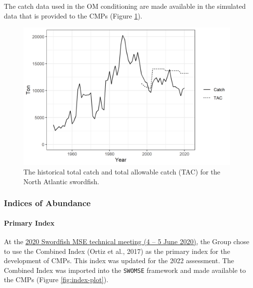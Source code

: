 \documentclass[
]{article}
\begin{document}
The catch data used in the OM conditioning are made available in the simulated data that is provided to the CMPs (Figure \ref{fig:catch-plot}).

\begin{figure}
\includegraphics[width=25in]{../../img/Catch_TAC} \caption{The historical total catch and total allowable catch (TAC) for the North Atlantic swordfish.}\label{fig:catch-plot}
\end{figure}

\hypertarget{indices-of-abundance}{%
\subsubsection{Indices of Abundance}\label{indices-of-abundance}}

\hypertarget{primary-index}{%
\paragraph{Primary Index}\label{primary-index}}

At the \href{../Meeting_Reports/2020_SWO_MSE_1_ENG.pdf}{2020 Swordfish MSE technical meeting (4 -- 5 June 2020)}, the Group chose to use the Combined Index (Ortiz et al., 2017) as the primary index for the development of CMPs. This index was updated for the 2022 assessment. The Combined Index was imported into the \texttt{SWOMSE} framework and made available to the CMPs (Figure \ref{fig:index-plot}).
\end{document}
